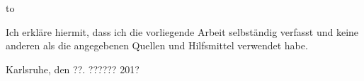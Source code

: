 \thispagestyle{empty}
\vspace*{42\baselineskip}
\hbox to \textwidth{\hrulefill}
\par
Ich erkläre hiermit, dass ich die vorliegende Arbeit selbständig verfasst und
keine anderen als die angegebenen Quellen und Hilfsmittel verwendet habe.

Karlsruhe, den ??. ?????? 201?

\clearpage






